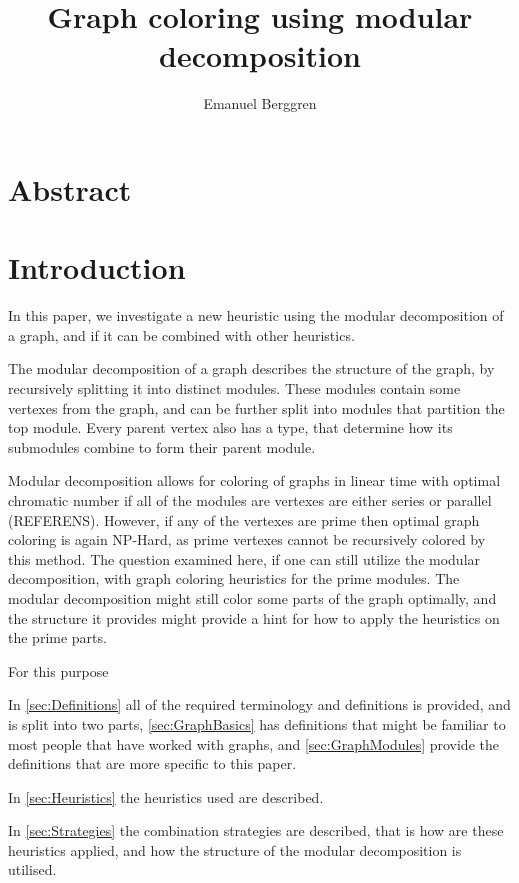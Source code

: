 \documentclass{amsart}
\author{Emanuel Berggren}
\title{Graph coloring using modular decomposition}
\begin{document}
\maketitle

\section{Abstract}

\section{Introduction}

In this paper, we investigate a new heuristic using the modular decomposition of
a graph, and if it can be combined with other heuristics. 

The modular decomposition of a graph describes the structure of the graph, by
recursively splitting it into distinct modules. These modules contain some
vertexes from the graph, and can be further split into modules that partition
the top module. Every parent vertex also has a type, that determine how its submodules
combine to form their parent module.

Modular decomposition allows for coloring of graphs in linear time with optimal
chromatic number if all of the modules are vertexes are either  series or
parallel (REFERENS). However, if any of the vertexes are prime then optimal graph coloring 
is again NP-Hard, as prime vertexes cannot be recursively colored by this
method. The question examined here, if one can still utilize the
modular decomposition, with graph coloring heuristics for the prime modules.
The modular decomposition might still color some parts of the graph optimally,
and the structure it provides might provide a hint for how to apply the
heuristics on the prime parts.

For this purpose

In \autoref{sec:Definitions} all of the required terminology and definitions is
provided, and is split into two parts, \autoref{sec:GraphBasics} has definitions that might be
familiar to most people that have worked with graphs, and
\autoref{sec:GraphModules} provide the definitions that are more specific to
this paper.

In \autoref{sec:Heuristics} the heuristics used are described.

In \autoref{sec:Strategies} the combination strategies are described, that is how are
these heuristics applied, and how the structure of the modular decomposition is
utilised.
\end{document}
